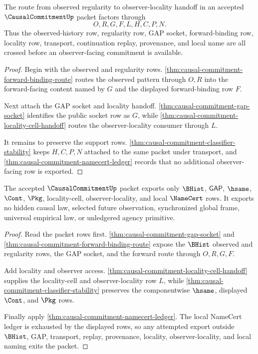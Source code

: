 \begin{theorem}
\label{thm:causal-commitment-forward-gap-observer-route}
The route from observed regularity to observer-locality handoff in an accepted $\CausalCommitmentUp$ packet factors through
$$
O,R,G,F,L,H,C,P,N.
$$
Thus the observed-history row, regularity row, GAP socket, forward-binding row, locality row, transport, continuation replay, provenance, and local name are all crossed before an observer-facing commitment is available.
\end{theorem}
\begin{proof}
Begin with the observed and regularity rows. \autoref{thm:causal-commitment-forward-binding-route} routes the observed pattern through $O,R$ into the forward-facing content named by $G$ and the displayed forward-binding row $F$.

Next attach the GAP socket and locality handoff. \autoref{thm:causal-commitment-gap-socket} identifies the public socket row as $G$, while \autoref{thm:causal-commitment-locality-cell-handoff} routes the observer-locality consumer through $L$.

It remains to preserve the support rows. \autoref{thm:causal-commitment-classifier-stability} keeps $H,C,P,N$ attached to the same packet under transport, and \autoref{thm:causal-commitment-namecert-ledger} records that no additional observer-facing row is exported.
\end{proof}

\begin{theorem}
\label{thm:causal-commitment-kernel-row-exhaustion}
The accepted $\CausalCommitmentUp$ packet exports only $\BHist$, $\mathsf{GAP}$, $\hsame$, $\Cont$, $\Pkg$, locality-cell, observer-locality, and local $\NameCert$ rows. It exports no hidden causal law, selected future observation, synchronized global frame, universal empirical law, or unledgered agency primitive.
\end{theorem}
\begin{proof}
Read the packet rows first. \autoref{thm:causal-commitment-gap-socket} and \autoref{thm:causal-commitment-forward-binding-route} expose the $\BHist$ observed and regularity rows, the GAP socket, and the forward route through $O,R,G,F$.

Add locality and observer access. \autoref{thm:causal-commitment-locality-cell-handoff} supplies the locality-cell and observer-locality row $L$, while \autoref{thm:causal-commitment-classifier-stability} preserves the componentwise $\hsame$, displayed $\Cont$, and $\Pkg$ rows.

Finally apply \autoref{thm:causal-commitment-namecert-ledger}. The local NameCert ledger is exhausted by the displayed rows, so any attempted export outside $\BHist$, GAP, transport, replay, provenance, locality, observer-locality, and local naming exits the packet.
\end{proof}

